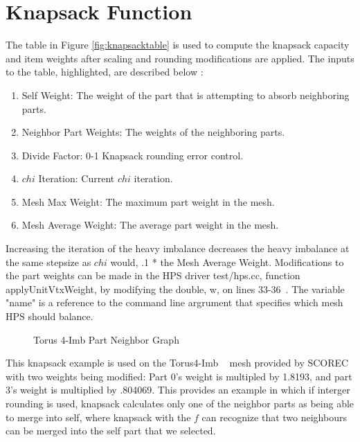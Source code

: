 \documentclass[a4paper]{article}
\begin{document}
\section{Knapsack Function}
\label{sec:knapsack}

The table in Figure \ref{fig:knapsacktable} is used to compute the knapsack capacity and item weights after scaling and rounding modifications are applied.  The inputs to the table, highlighted, are described below :
\begin{enumerate}
  \item Self Weight: The weight of the part that is attempting to absorb neighboring parts. 
  \item Neighbor Part Weights: The weights of the neighboring parts.
  \item Divide Factor: 0-1 Knapsack rounding error control. 
  \item $chi$ Iteration: Current $chi$ iteration.
  \item	Mesh Max Weight: The maximum part weight in the mesh.
  \item Mesh Average Weight: The average part weight in the mesh.
\end{enumerate} 
Increasing the iteration of the heavy imbalance decreases the heavy imbalance at the same stepsize as $chi$ would, .1 * the Mesh Average Weight. Modifications to the part weights can be made in the HPS driver test/hps.cc, function applyUnitVtxWeight, by modifying the double, w, on lines 33-36~\cite{scorecGH}. The variable "name" is a reference to the command line argrument that specifies which mesh HPS should balance.

\begin{figure}
\centering
\caption{Torus 4-Imb Part Neighbor Graph~\cite{meshes}}
\label{fig:torus4imb}
\end{figure}

This knapsack example is used on the Torus4-Imb ~\cite{meshes} mesh provided by SCOREC with two weights being modified: Part 0's weight is multipled by 1.8193, and part 3's weight is multiplied by .804069. This provides an example in which if interger rounding is used, knapsack calculates only one of the neighbor parts as being able to merge into self, where knapsack with the $f$ can recognize that two neighbours can be merged into the self part that we selected. 
\end{document}
